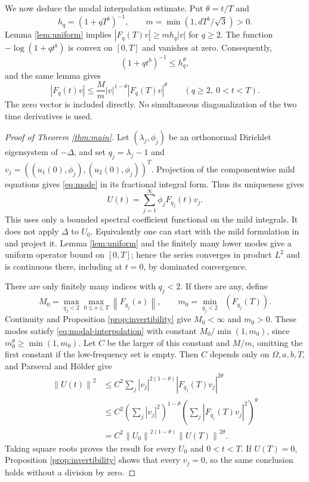 \documentclass[11pt]{article}
\newcommand{\norm}[1]{\left\lVert#1\right\rVert}
\DeclareMathOperator{\sigmamin}{\sigma_{min}}
\begin{document}
We now deduce the modal interpolation estimate. Put $\theta=t/T$ and
\[
 h_q=(1+qT^b)^{-1},\qquad m=\min(1,dT^b/\sqrt3)>0.
\]
Lemma \ref{lem:uniform} implies $|F_q(T)v|\ge mh_q|v|$ for $q\ge2$.
The function $-\log(1+qt^b)$ is convex on $[0,T]$ and vanishes at zero.
Consequently,
\[
 (1+qt^b)^{-1}\le h_q^\theta,
\]
and the same lemma gives
\begin{equation}\label{eq:modal-interpolation}
 |F_q(t)v|\le \frac Mm|v|^{1-\theta}|F_q(T)v|^\theta
 \qquad(q\ge2,\ 0<t<T).
\end{equation}
The zero vector is included directly. No simultaneous diagonalization of
the two time derivatives is used.

\begin{proof}[Proof of Theorem \ref{thm:main}]
Let $(\lambda_j,\phi_j)$ be an orthonormal Dirichlet eigensystem of
$-\Delta$, and set $q_j=\lambda_j-1$ and
$v_j=((u_1(0),\phi_j),(u_2(0),\phi_j))^T$.
Projection of the componentwise mild equations gives
\eqref{eq:mode} in its fractional integral form. Thus its uniqueness gives
\begin{equation}\label{eq:series}
 U(t)=\sum_{j=1}^\infty\phi_jF_{q_j}(t)v_j.
\end{equation}
This uses only a bounded spectral coefficient functional on the mild
integrals. It does not apply $\Delta$ to $U_0$. Equivalently one can start
with the mild formulation in \cite[Definition 1 and Theorem 1]{LHL} and
project it. Lemma \ref{lem:uniform} and the finitely many lower modes give
a uniform operator bound on $[0,T]$; hence the series converges in product
$L^2$ and is continuous there, including at $t=0$, by dominated convergence.

There are only finitely many indices with $q_j<2$. If there are any, define
\[
 M_0=\max_{q_j<2}\max_{0\le s\le T}\norm{F_{q_j}(s)},\qquad
 m_0=\min_{q_j<2}\sigmamin(F_{q_j}(T)).
\]
Continuity and Proposition \ref{prop:invertibility} give $M_0<\infty$
and $m_0>0$. These modes satisfy \eqref{eq:modal-interpolation} with
constant $M_0/\min(1,m_0)$, since $m_0^\theta\ge\min(1,m_0)$.
Let $C$ be the larger of this constant and $M/m$, omitting the first
constant if the low-frequency set is empty. Then $C$ depends only on
$\Omega,a,b,T$, and Parseval and H\"older give
\begin{align*}
 \norm{U(t)}^2
 &\le C^2\sum_j |v_j|^{2(1-\theta)}|F_{q_j}(T)v_j|^{2\theta}\\
 &\le C^2\left(\sum_j|v_j|^2\right)^{1-\theta}
          \left(\sum_j|F_{q_j}(T)v_j|^2\right)^\theta\\
 &=C^2\norm{U_0}^{2(1-\theta)}\norm{U(T)}^{2\theta}.
\end{align*}
Taking square roots proves the result for every $U_0$ and $0<t<T$.
If $U(T)=0$, Proposition \ref{prop:invertibility} shows that every $v_j=0$,
so the same conclusion holds without a division by zero.
\end{proof}
\end{document}
